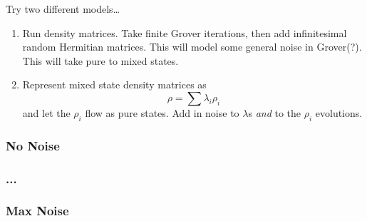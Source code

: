 Try two different models\dots
\begin{enumerate}
\item Run density matrices.  Take finite Grover iterations, then add
infinitesimal random Hermitian matrices.  This will model some general
noise in Grover(?). This will take pure to mixed states.
\item Represent mixed state density matrices as
\begin{equation}
\rho = \sum\lambda_i\rho_i
\end{equation}
and let the $\rho_i$ flow as pure states.  Add in noise to $\lambda$s
{\sl and} to the $\rho_i$ evolutions.
\end{enumerate}

\subsubsection{No Noise}
\subsubsection{...}
\subsubsection{Max Noise}
